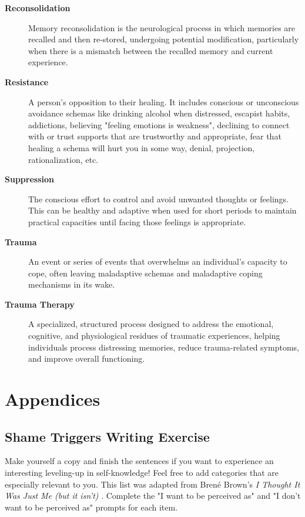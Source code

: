 \documentclass[12pt,letterpaper]{article}
\begin{document}
\begin{description}
    \item[\textbf{Reconsolidation}] Memory reconsolidation is the neurological process in which memories are recalled and then re-stored, undergoing potential modification, particularly when there is a mismatch between the recalled memory and current experience. 
    \item[\textbf{Resistance}] A person's opposition to their healing. It includes conscious or unconscious avoidance schemas like drinking alcohol when distressed, escapist habits, addictions, believing "feeling emotions is weakness", declining to connect with or trust supports that are trustworthy and appropriate, fear that healing a schema will hurt you in some way, denial, projection, rationalization, etc.
    \item[\textbf{Suppression}] The conscious effort to control and avoid unwanted thoughts or feelings. This can be healthy and adaptive when used for short periods to maintain practical capacities until facing those feelings is appropriate.
    \item[\textbf{Trauma}] An event or series of events that overwhelms an individual's capacity to cope, often leaving maladaptive schemas and maladaptive coping mechanisms in its wake.
    \item[\textbf{Trauma Therapy}] A specialized, structured process designed to address the emotional, cognitive, and physiological residues of traumatic experiences, helping individuals process distressing memories, reduce trauma-related symptoms, and improve overall functioning.
\end{description}
\appendix
\section{Appendices}
\subsection{Shame Triggers Writing Exercise}
\label{sec:shametriggers}
Make yourself a copy and finish the sentences if you want to experience an interesting leveling-up in self-knowledge! Feel free to add categories that are especially relevant to you. This list was adapted from Brené Brown's \textit{I Thought It Was Just Me (but it isn't)} \cite{brownThought}. Complete the "I want to be perceived as" and "I don't want to be perceived as" prompts for each item.
\end{document}
